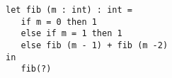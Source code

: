 \begin{lstlisting}[style=Slang]
let fib (m : int) : int = 
   if m = 0 then 1 
   else if m = 1 then 1 
   else fib (m - 1) + fib (m -2) 
in 
   fib(?) 
\end{lstlisting}
